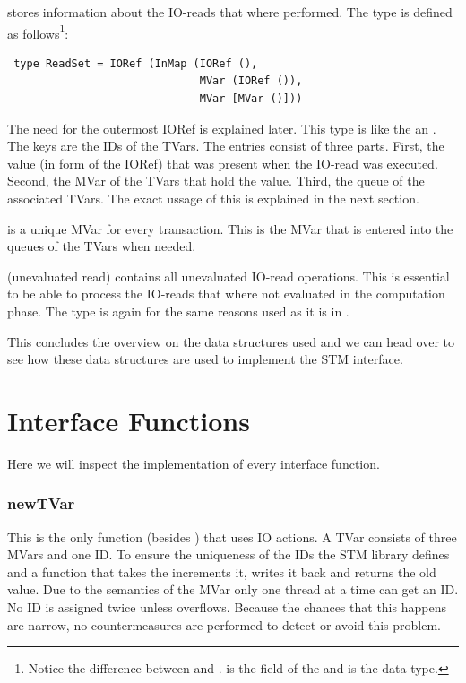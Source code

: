  stores information about the IO-reads that where performed. The type 
is defined as follows\footnote{Notice the difference between 
 and .  is the field of the  and 
 is the data type.}:
\begin{lstlisting}
 type ReadSet = IORef (InMap (IORef (), 
                              MVar (IORef ()), 
                              MVar [MVar ()]))
\end{lstlisting}
The need for the outermost IORef is explained later. This type is like the  an 
. The keys are the IDs of the TVars. The entries consist of three parts. First,
the value (in form of the IORef) that was present when the IO-read was executed. Second, the 
MVar of the TVars that hold the value. Third, the queue of the associated TVars.
The exact ussage of this is explained in the next section.

 is a unique MVar for every transaction. This is the MVar that is entered into
the queues of the TVars when needed.

(unevaluated read) contains all unevaluated IO-read operations. This is essential to be able to 
process the IO-reads that where not evaluated in the computation phase. The  type
is again for the same reasons used as it is in .

This concludes the overview on the data structures used and we can head over to see how these
data structures are used to implement the STM interface.





\section{Interface Functions}
\label{sec:IFFun}
Here we will inspect the implementation of every interface function. 

\subsubsection{newTVar}
This is the only function (besides ) that uses IO actions. A TVar consists of three MVars
and one ID. To ensure the uniqueness of the IDs the STM library defines 
and a function  that takes the  increments it, writes it back 
and returns the old value. Due to the semantics of the MVar only one thread at a time can get an ID. 
No ID is assigned twice unless  overflows. Because the chances that this happens 
are narrow, no countermeasures are performed to detect or avoid this problem. 

